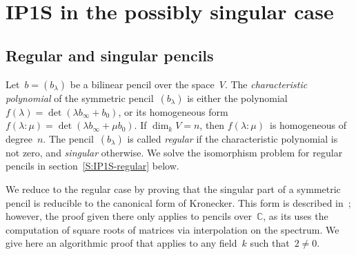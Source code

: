 \documentclass{lms}%
\begin{document}
\section{IP1S in the possibly singular case}%
\label{S:IP1S-singular}
\subsection{Regular and singular pencils}%
Let~$b = (b_{λ})$ be a bilinear pencil over the space~$V$. The
\emph{characteristic polynomial} of the symmetric pencil~$(b_{λ})$ is
either the polynomial~$f(λ) = \det (λ b_{∞} + b_{0})$, or its homogeneous
form~$f(λ: μ) = \det (λ b_{∞} + μ b_{0})$. If $\dim_{k} V = n$, then
$f(λ: μ)$~is homogeneous of degree~$n$. The pencil~$(b_{λ})$ is called
\emph{regular} if the characteristic polynomial is not zero, and
\emph{singular} otherwise. We solve the isomorphism problem for regular
pencils in section~\ref{S:IP1S-regular} below.

We reduce to the regular case by proving that the singular part of a
symmetric pencil is reducible to the canonical form of Kronecker. This
form is described in~\cite[XII(56)]{Gantmacher2}; however, the proof
given there only applies to pencils over~$ℂ$, as its uses the computation
of square roots of matrices via interpolation on the spectrum. We give
here an algorithmic proof that applies to any field~$k$ such that~$2 ≠
0$.
\end{document}
